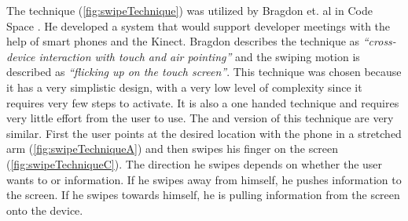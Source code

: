 \begin{figure}[H]
	\label{fig:grabTechnique}
\end{figure}

The \swipe technique (\cref{fig:swipeTechnique}) was utilized by Bragdon et. al in Code Space \cite{Bragdon:2011}.
He developed a system that would support developer meetings with the help of smart phones and the Kinect. Bragdon describes the technique as \emph{``cross-device interaction with touch and air pointing''} and the swiping motion is described as \emph{``flicking up on the touch screen''}.
This technique was chosen because it has a very simplistic design, with a very low level of complexity since it requires very few steps to activate.
It is also a one handed technique and requires very little effort from the user to use.
The \push and \pull version of this technique are very similar.
First the user points at the desired location with the phone in a stretched arm (\cref{fig:swipeTechniqueA}) and then swipes his finger on the screen (\cref{fig:swipeTechniqueC}).
The direction he swipes depends on whether the user wants to \push or \pull information.
If he swipes away from himself, he pushes information to the screen.
If he swipes towards himself, he is pulling information from the screen onto the device.  

